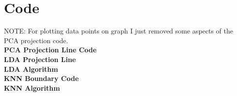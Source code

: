 \documentclass[11pt]{article}
\begin{document}
\section*{Code}
NOTE: For plotting data points on graph I just removed some aspects of the PCA projection code.\\
\textbf{PCA Projection Line Code}\\

\textbf{LDA Projection Line}\\

\textbf{LDA Algorithm}\\

\textbf{KNN Boundary Code}\\

\textbf{KNN Algorithm}\\

\end{document}
